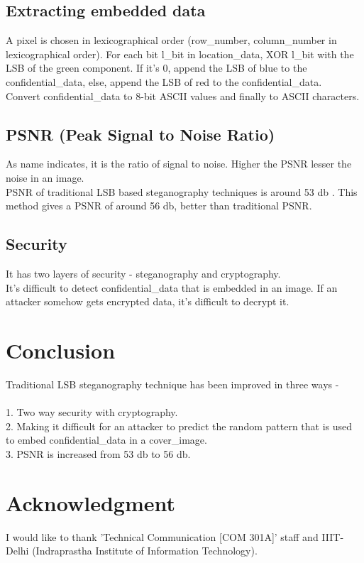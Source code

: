\documentclass[conference]{IEEEtran}
\begin{document}
\subsection{Extracting embedded data}
A pixel is chosen in lexicographical order (row\_number, column\_number in lexicographical order).
For each bit l\_bit in location\_data, XOR l\_bit with the LSB of the green component.
If it's 0, append the LSB of blue to the confidential\_data, else, append the LSB of red to the confidential\_data.\\

Convert confidential\_data to 8-bit ASCII values and finally to ASCII characters.\\
\subsection{PSNR (Peak Signal to Noise Ratio)}
As name indicates, it is the ratio of signal to noise.
Higher the PSNR lesser the noise in an image.\\

PSNR of traditional LSB based steganography techniques is around 53 db \cite{b1}.
This method gives a PSNR of around 56 db, better than traditional PSNR.\\  
\subsection{Security}
It has two layers of security - steganography and cryptography.\\

It's difficult to detect confidential\_data that is embedded in an image.
If an attacker somehow gets encrypted data, it's difficult to decrypt it.\\
\section{Conclusion}
Traditional LSB steganography technique has been improved in three ways -\\ \\
1. Two way security with cryptography.\\
2. Making it difficult for an attacker to predict the random pattern that is used to embed confidential\_data in a cover\_image.\\
3. PSNR is increased from 53 db to 56 db.\\
\section*{Acknowledgment}
I would like to thank 'Technical Communication [COM 301A]' staff and IIIT-Delhi (Indraprastha Institute of Information Technology).\\
\end{document}
